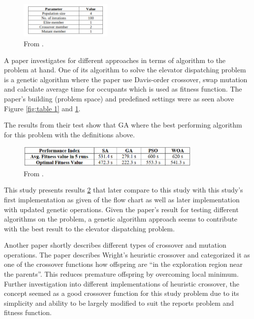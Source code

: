 \begin{figure}[ht]
	\centering
	\includegraphics[width=0.4\textwidth]{figures/samuel.png}
	\caption{From \cite{ahmed2022investigation}.}
	\label{fig:table 2}
\end{figure}

A paper\cite{ahmed2022investigation} investigates for different approaches in terms of algorithm to the problem at hand. One of its algorithm to solve the elevator dispatching problem is a genetic algorithm where the paper use Davis-order crossover, swap mutation and calculate average time for occupants  which is used as fitness function. The paper's building (problem space) and predefined settings were as seen above Figure \ref{fig:table 1} and \ref{fig:table 2}.

The results from their test show that GA where the best performing algorithm for this problem with the definitions above.
\begin{figure}[ht]
	\centering
	\includegraphics[width=0.8\textwidth]{figures/results.png}
	\caption{From \cite{ahmed2022investigation}.}
	\label{fig:results}
\end{figure}

This study presents results \ref{fig:results} that later compare to this study with this study's first implementation as given of the flow chart \cite{tartan2016genetic} as well as later implementation with updated genetic operations. Given the paper's result for testing different algorithms on the problem, a genetic algorithm approach seems to contribute with the best result to the elevator dispatching problem.

Another paper\cite{lim2017crossover} shortly describes different types of crossover and mutation operations. The paper describes Wright's heuristic crossover and categorized it as one of the crossover functions how offspring are “in the exploration region near the parents”\cite{lim2017crossover}. This reduces premature offspring by overcoming local minimum. Further investigation into different implementations of heuristic crossover, the concept seemed as a good crossover function for this study problem due to its simplicity and ability to be largely modified to suit the reports problem and fitness function.


